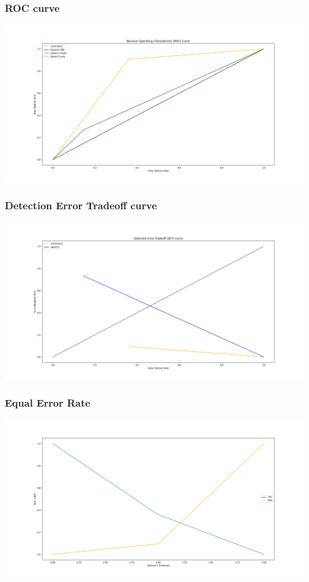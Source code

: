 \documentclass{beamer}
\begin{document}
\begin{frame}
    \frametitle{ROC curve}
    \begin{center}
        \includegraphics[scale=0.23]{../report/images/roc.png}
    \end{center}
\end{frame}

\begin{frame}
    \frametitle{Detection Error Tradeoff curve}
    \begin{center}
        \includegraphics[scale=0.23]{../report/images/det.png}
    \end{center}
\end{frame}

\begin{frame}
    \frametitle{Equal Error Rate}
    \begin{center}
        \includegraphics[scale=0.23]{../report/images/eet.png}
    \end{center}
\end{frame}
\end{document}
